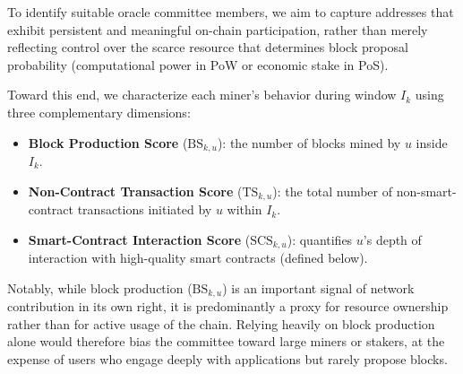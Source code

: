 \documentclass[journal]{IEEEtran}
\begin{document}


To identify suitable oracle committee members, we aim to capture addresses that exhibit persistent and meaningful on-chain participation, rather than merely reflecting control over the scarce resource that determines block proposal probability (computational power in PoW or economic stake in PoS).

Toward this end, we characterize each miner's behavior during window $I_k$ using three complementary dimensions:

\begin{itemize}
    \item \textbf{Block Production Score} ($\text{BS}_{k,u}$): the number of blocks mined by $u$ inside $I_k$.
   
    \item \textbf{Non-Contract Transaction Score} ($\text{TS}_{k,u}$): the total number of non-smart-contract transactions initiated by $u$ within $I_k$.
   
    \item \textbf{Smart-Contract Interaction Score} ($\text{SCS}_{k,u}$): quantifies $u$'s depth of interaction with high-quality smart contracts (defined below).
\end{itemize}

Notably, while block production ($\text{BS}_{k,u}$) is an important signal of network contribution in its own right, it is predominantly a proxy for resource ownership rather than for active usage of the chain. Relying heavily on block production alone would therefore bias the committee toward large miners or stakers, at the expense of users who engage deeply with applications but rarely propose blocks.
\end{document}
